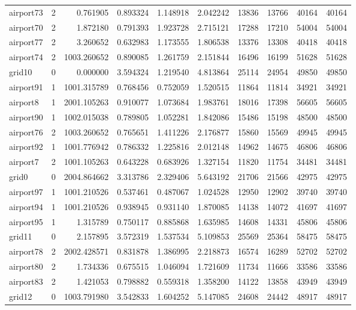 \begin{longtable}{|l|r|r|r|r|r|r|r|r|r|}
airport73 & 2 & 0.761905 & 0.893324 & 1.148918 & 2.042242 & 13836 & 13766 & 40164 & 40164 \\
airport70 & 2 & 1.872180 & 0.791393 & 1.923728 & 2.715121 & 17288 & 17210 & 54004 & 54004 \\
airport77 & 2 & 3.260652 & 0.632983 & 1.173555 & 1.806538 & 13376 & 13308 & 40418 & 40418 \\
airport74 & 2 & 1003.260652 & 0.890085 & 1.261759 & 2.151844 & 16496 & 16199 & 51628 & 51628 \\
grid10 & 0 & 0.000000 & 3.594324 & 1.219540 & 4.813864 & 25114 & 24954 & 49850 & 49850 \\
airport91 & 1 & 1001.315789 & 0.768456 & 0.752059 & 1.520515 & 11864 & 11814 & 34921 & 34921 \\
airport8 & 1 & 2001.105263 & 0.910077 & 1.073684 & 1.983761 & 18016 & 17398 & 56605 & 56605 \\
airport90 & 1 & 1002.015038 & 0.789805 & 1.052281 & 1.842086 & 15486 & 15198 & 48500 & 48500 \\
airport76 & 2 & 1003.260652 & 0.765651 & 1.411226 & 2.176877 & 15860 & 15569 & 49945 & 49945 \\
airport92 & 1 & 1001.776942 & 0.786332 & 1.225816 & 2.012148 & 14962 & 14675 & 46806 & 46806 \\
airport7 & 2 & 1001.105263 & 0.643228 & 0.683926 & 1.327154 & 11820 & 11754 & 34481 & 34481 \\
grid0 & 0 & 2004.864662 & 3.313786 & 2.329406 & 5.643192 & 21706 & 21566 & 42975 & 42975 \\
airport97 & 1 & 1001.210526 & 0.537461 & 0.487067 & 1.024528 & 12950 & 12902 & 39740 & 39740 \\
airport94 & 1 & 1001.210526 & 0.938945 & 0.931140 & 1.870085 & 14138 & 14072 & 41697 & 41697 \\
airport95 & 1 & 1.315789 & 0.750117 & 0.885868 & 1.635985 & 14608 & 14331 & 45806 & 45806 \\
grid11 & 0 & 2.157895 & 3.572319 & 1.537534 & 5.109853 & 25569 & 25364 & 58475 & 58475 \\
airport78 & 2 & 2002.428571 & 0.831878 & 1.386995 & 2.218873 & 16574 & 16289 & 52702 & 52702 \\
airport80 & 2 & 1.734336 & 0.675515 & 1.046094 & 1.721609 & 11734 & 11666 & 33586 & 33586 \\
airport83 & 2 & 1.421053 & 0.798882 & 0.559318 & 1.358200 & 14122 & 13858 & 43949 & 43949 \\
grid12 & 0 & 1003.791980 & 3.542833 & 1.604252 & 5.147085 & 24608 & 24442 & 48917 & 48917 \\

\end{longtable}
